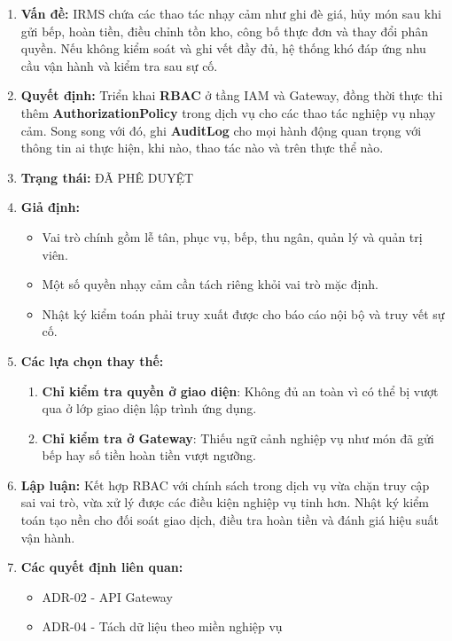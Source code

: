 \documentclass[11pt,a4paper]{article}
\begin{document}
\begin{adrbox}[title={ADR-05: Áp Dụng RBAC Và Nhật Ký Kiểm Toán Cho Tác Vụ Nhạy Cảm}]
\begin{enumerate}[leftmargin=1.9em,label=\arabic*.]
  \item \textbf{Vấn đề:} IRMS chứa các thao tác nhạy cảm như ghi đè giá, hủy món sau khi gửi bếp, hoàn tiền, điều chỉnh tồn kho, công bố thực đơn và thay đổi phân quyền. Nếu không kiểm soát và ghi vết đầy đủ, hệ thống khó đáp ứng nhu cầu vận hành và kiểm tra sau sự cố.
  \item \textbf{Quyết định:} Triển khai \textbf{RBAC} ở tầng IAM và Gateway, đồng thời thực thi thêm \textbf{AuthorizationPolicy} trong dịch vụ cho các thao tác nghiệp vụ nhạy cảm. Song song với đó, ghi \textbf{AuditLog} cho mọi hành động quan trọng với thông tin ai thực hiện, khi nào, thao tác nào và trên thực thể nào.
  \item \textbf{Trạng thái:} ĐÃ PHÊ DUYỆT
  \item \textbf{Giả định:}
  \begin{itemize}[leftmargin=1.8em]
    \item Vai trò chính gồm lễ tân, phục vụ, bếp, thu ngân, quản lý và quản trị viên.
    \item Một số quyền nhạy cảm cần tách riêng khỏi vai trò mặc định.
    \item Nhật ký kiểm toán phải truy xuất được cho báo cáo nội bộ và truy vết sự cố.
  \end{itemize}
  \item \textbf{Các lựa chọn thay thế:}
  \begin{enumerate}[label=(\alph*),leftmargin=2.1em]
    \item \textbf{Chỉ kiểm tra quyền ở giao diện}: Không đủ an toàn vì có thể bị vượt qua ở lớp giao diện lập trình ứng dụng.
    \item \textbf{Chỉ kiểm tra ở Gateway}: Thiếu ngữ cảnh nghiệp vụ như món đã gửi bếp hay số tiền hoàn tiền vượt ngưỡng.
  \end{enumerate}
  \item \textbf{Lập luận:} Kết hợp RBAC với chính sách trong dịch vụ vừa chặn truy cập sai vai trò, vừa xử lý được các điều kiện nghiệp vụ tinh hơn. Nhật ký kiểm toán tạo nền cho đối soát giao dịch, điều tra hoàn tiền và đánh giá hiệu suất vận hành.
  \item \textbf{Các quyết định liên quan:}
  \begin{itemize}[leftmargin=1.8em]
    \item ADR-02 - API Gateway
    \item ADR-04 - Tách dữ liệu theo miền nghiệp vụ
  \end{itemize}
\end{enumerate}
\end{adrbox}
\end{document}
